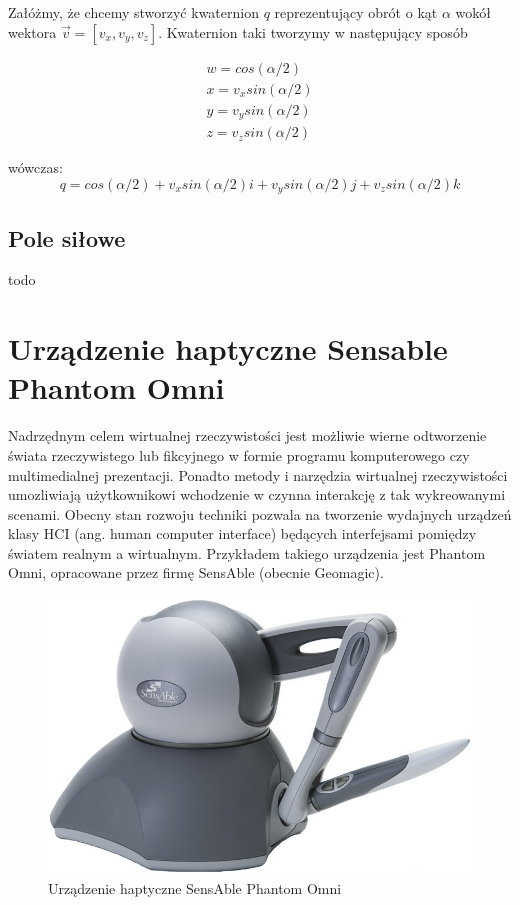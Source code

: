 \documentclass[licencjacka]{pracamgr}
\begin{document}
Załóżmy, że chcemy stworzyć kwaternion $q$ reprezentujący obrót o kąt $\alpha$ wokół wektora $\vec{v}=[v_x,v_y,v_z]$. Kwaternion taki tworzymy w następujący sposób

$$
\begin{array}{lr}
w=cos(\alpha/2) \\
x=v_x sin(\alpha/2) \\
y=v_y sin(\alpha/2) \\
z=v_z sin(\alpha/2) 
\end{array}
$$

wówczas:
$$
q=cos(\alpha/2)+v_xsin(\alpha/2)i+v_ysin(\alpha/2)j+v_zsin(\alpha/2)k
$$


\section{Pole siłowe}
todo
	
\chapter{Urządzenie haptyczne Sensable Phantom Omni}
Nadrzędnym celem wirtualnej rzeczywistości jest możliwie wierne odtworzenie świata rzeczywistego lub fikcyjnego w formie programu komputerowego czy multimedialnej prezentacji. Ponadto metody i narzędzia wirtualnej rzeczywistości umozliwiają użytkownikowi wchodzenie w czynna interakcję z tak wykreowanymi scenami. Obecny stan rozwoju techniki pozwala na tworzenie wydajnych urządzeń klasy HCI (ang. human computer interface) będących interfejsami pomiędzy światem realnym a wirtualnym. Przykładem takiego urządzenia jest Phantom Omni, opracowane przez firmę SensAble (obecnie Geomagic). 

\begin{figure}[H]
\centering
\includegraphics[scale=0.5,center]{Sensable_Phantom_Omni}
\caption{Urządzenie haptyczne SensAble Phantom Omni}
\end{figure}
\end{document}
